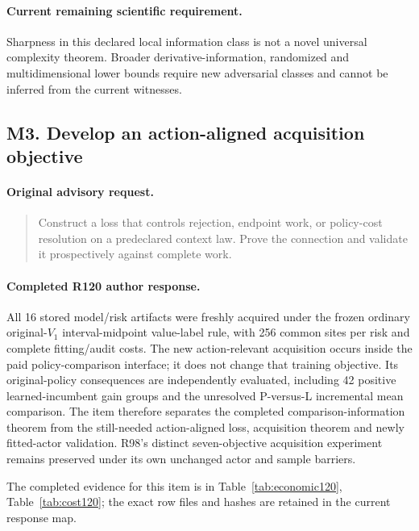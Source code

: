 \paragraph{Current remaining scientific requirement.}
Sharpness in this declared local information class is not a novel universal complexity theorem. Broader derivative-information, randomized and multidimensional lower bounds require new adversarial classes and cannot be inferred from the current witnesses.

\subsection{M3. Develop an action-aligned acquisition objective}
\label{response122:M3}

\paragraph{Original advisory request.}
\begin{quote}
Construct a loss that controls rejection, endpoint work, or policy-cost resolution on a predeclared context law. Prove the connection and validate it prospectively against complete work.
\end{quote}

\paragraph{Completed R120 author response.}
All 16 stored model/risk artifacts were freshly acquired under the frozen ordinary original-$V_1$ interval-midpoint value-label rule, with 256 common sites per risk and complete fitting/audit costs. The new action-relevant acquisition occurs inside the paid policy-comparison interface; it does not change that training objective. Its original-policy consequences are independently evaluated, including 42 positive learned-incumbent gain groups and the unresolved P-versus-L incremental mean comparison. The item therefore separates the completed comparison-information theorem from the still-needed action-aligned loss, acquisition theorem and newly fitted-actor validation. R98's distinct seven-objective acquisition experiment remains preserved under its own unchanged actor and sample barriers.

The completed evidence for this item is in Table~\ref{tab:economic120}, Table~\ref{tab:cost120}; the exact row files and hashes are retained in the current response map.

